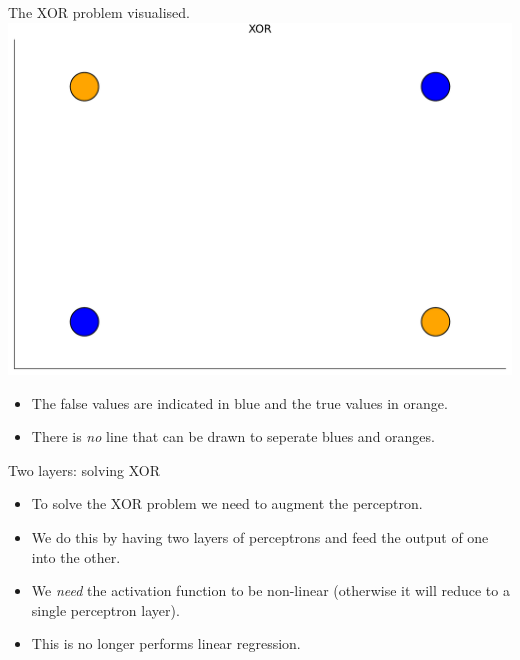 \documentclass[
  ignorenonframetext,
]{beamer}
\providecommand{\tightlist}{%
  \setlength{\itemsep}{0pt}\setlength{\parskip}{0pt}}\usepackage{longtable,booktabs,array}
\begin{document}
\begin{frame}{The XOR problem visualised.}
\protect\hypertarget{the-xor-problem-visualised.}{}
\includegraphics{lecture2_files/figure-beamer/cell-15-output-1.pdf}

\begin{itemize}
\tightlist
\item
  The false values are indicated in blue and the true values in orange.
\item
  There is \emph{no} line that can be drawn to seperate blues and
  oranges.
\end{itemize}
\end{frame}

\begin{frame}{Two layers: solving XOR}
\protect\hypertarget{two-layers-solving-xor}{}
\begin{itemize}
\item
  To solve the XOR problem we need to augment the perceptron.
\item
  We do this by having two layers of perceptrons and feed the output of
  one into the other.
\item
  We \emph{need} the activation function to be non-linear (otherwise it
  will reduce to a single perceptron layer).
\item
  This is no longer performs linear regression.
\end{itemize}

\end{frame}
\end{document}
